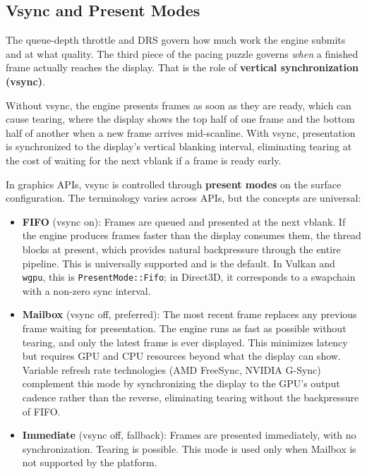 \documentclass[
  11pt,
  letterpaper,
  DIV=11,
  numbers=noendperiod,
  twoside,
  open=right]{scrreprt}
\begin{document}
\subsection{Vsync and Present Modes}\label{vsync-and-present-modes}

The queue-depth throttle and DRS govern how much work the engine submits
and at what quality. The third piece of the pacing puzzle governs
\emph{when} a finished frame actually reaches the display. That is the
role of \textbf{vertical synchronization (vsync)}.

Without vsync, the engine presents frames as soon as they are ready,
which can cause tearing, where the display shows the top half of one
frame and the bottom half of another when a new frame arrives
mid-scanline. With vsync, presentation is synchronized to the display's
vertical blanking interval, eliminating tearing at the cost of waiting
for the next vblank if a frame is ready early.

In graphics APIs, vsync is controlled through \textbf{present modes} on
the surface configuration. The terminology varies across APIs, but the
concepts are universal:

\begin{itemize}
\item
  \textbf{FIFO} (vsync on): Frames are queued and presented at the next
  vblank. If the engine produces frames faster than the display consumes
  them, the thread blocks at present, which provides natural
  backpressure through the entire pipeline. This is universally
  supported and is the default. In Vulkan and \texttt{wgpu}, this is
  \texttt{PresentMode::Fifo}; in Direct3D, it corresponds to a swapchain
  with a non-zero sync interval.
\item
  \textbf{Mailbox} (vsync off, preferred): The most recent frame
  replaces any previous frame waiting for presentation. The engine runs
  as fast as possible without tearing, and only the latest frame is ever
  displayed. This minimizes latency but requires GPU and CPU resources
  beyond what the display can show. Variable refresh rate technologies
  (AMD FreeSync, NVIDIA G-Sync) complement this mode by synchronizing
  the display to the GPU's output cadence rather than the reverse,
  eliminating tearing without the backpressure of FIFO.
\item
  \textbf{Immediate} (vsync off, fallback): Frames are presented
  immediately, with no synchronization. Tearing is possible. This mode
  is used only when Mailbox is not supported by the platform.
\end{itemize}
\end{document}
